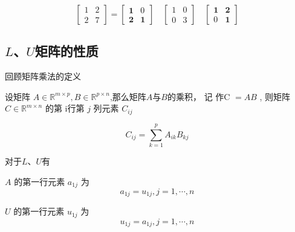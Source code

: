 \begin{example}
    \begin{equation} \left[\begin{array}{ll}1 & 2 \\ 2 & 7\end{array}\right]=\left[\begin{array}{ll}\mathbf{1} & 0 \\ \mathbf{2} & \mathbf{1}\end{array}\right] \quad\left[\begin{array}{ll}1 & 0 \\ 0 & 3\end{array}\right] \quad\left[\begin{array}{ll}\mathbf{1} & \mathbf{2} \\ 0 & \mathbf{1}\end{array}\right] \end{equation}
\end{example}


\subsection{$L$、$U$矩阵的性质}

回顾矩阵乘法的定义

\begin{definition}[矩阵乘法]
    设矩阵 $ A \in \mathbb{R}^{m \times p}, B \in \mathbb{R}^{p \times n} $,那么矩阵$A$与$B$的乘积， 记 作C $ =A B $ ,  则矩阵 $ C \in \mathbb{R}^{m \times n} $ 的第 i行第 $ j $ 列元素 $ C_{i j} $


    \begin{equation}
{C}_{i j}=\sum_{k=1}^{p} A_{i k} B_{k j}
\end{equation}
\end{definition}

对于$L$、$U$有

\begin{theorem}
    $ A $ 的第一行元素 $ a_{1 j} $ 为
    \begin{equation}
        a_{1 j}=u_{1 j}, j=1, \cdots, n
    \end{equation}
\end{theorem}

\begin{corollary}
    $ U $ 的第一行元素 $ u_{1 j} $ 为
    \begin{equation}
        u_{1 j}=a_{1 j}, j=1, \cdots, n
    \end{equation}
\end{corollary}

